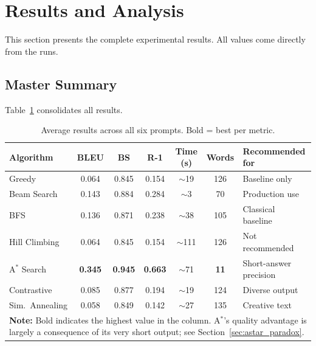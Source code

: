 \documentclass[12pt]{article}
\begin{document}
	\section{Results and Analysis}
	\label{sec:results}
	
	This section presents the complete experimental results. All values come directly from the runs.
	
	\subsection{Master Summary}
	
	Table~\ref{tab:master} consolidates all results.
	
\begin{table}[H]
	\centering
	\caption{Average results across all six prompts. Bold = best per metric.}
	\label{tab:master}
	\renewcommand{\arraystretch}{1.2}
	\small
	\setlength{\tabcolsep}{4pt}
	
	\begin{tabularx}{\linewidth}{l c c c c c X}
		\toprule
		\textbf{Algorithm} & \textbf{BLEU} & \textbf{BS} & \textbf{R-1} & \textbf{Time (s)} & \textbf{Words} & \textbf{Recommended for} \\
		\midrule
		Greedy          & 0.064 & 0.845 & 0.154 & $\sim$19  & 126 & Baseline only \\
		Beam Search     & 0.143 & 0.884 & 0.284 & $\sim$3   & 70  & Production use \\
		BFS             & 0.136 & 0.871 & 0.238 & $\sim$38  & 105 & Classical baseline \\
		Hill Climbing   & 0.064 & 0.845 & 0.154 & $\sim$111 & 126 & Not recommended \\
		A$^*$ Search    & \textbf{0.345} & \textbf{0.945} & \textbf{0.663} & $\sim$71  & \textbf{11} & Short-answer precision \\
		Contrastive     & 0.085 & 0.877 & 0.194 & $\sim$19  & 124 & Diverse output \\
		Sim.\ Annealing & 0.058 & 0.849 & 0.142 & $\sim$27  & 135 & Creative text \\
		\bottomrule
		\multicolumn{7}{p{\dimexpr\linewidth-2\tabcolsep}}{
			\vspace{2pt} \footnotesize \textbf{Note:} Bold indicates the highest value in the column. A$^*$'s quality advantage is largely a consequence of its very short output; see Section~\ref{sec:astar_paradox}.
		}
	\end{tabularx}
\end{table}
	
\end{document}
